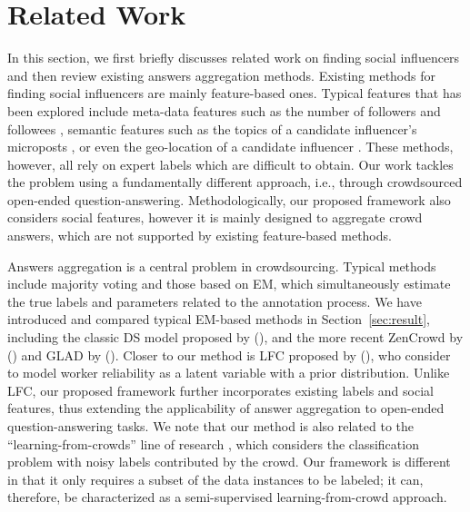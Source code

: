 \section{Related Work}

In this section, we first briefly discusses related work on finding social influencers and then review existing answers aggregation methods. Existing methods for finding social influencers are mainly feature-based ones. Typical features that has been explored include meta-data features such as the number of followers and followees \cite{Lehmann2013,Cheng2014}, semantic features such as the topics of a candidate influencer's microposts \cite{riahi2012finding,wei2016learning}, or even the geo-location of a candidate influencer \cite{Cheng2014} . These methods, however, all rely on expert labels which are difficult to obtain. Our work tackles the problem using a fundamentally different approach, i.e., through crowdsourced open-ended question-answering. Methodologically, our proposed framework also considers social features, however it is mainly designed to aggregate crowd answers, which are not supported by existing feature-based methods.


Answers aggregation is a central problem in crowdsourcing. Typical methods include majority voting \cite{sheng2008get} and those based on EM, which simultaneously estimate the true labels and parameters related to the annotation process. We have introduced and compared typical EM-based methods in Section~\ref{sec:result}, including the classic DS model proposed by \citeauthor{dawid1979maximum} (\citeyear{dawid1979maximum}), and the more recent ZenCrowd by \citeauthor{demartini2012zencrowd} (\citeyear{demartini2012zencrowd}) and GLAD by \citeauthor{whitehill2009whose} (\citeyear{whitehill2009whose}). Closer to our method is LFC proposed by \citeauthor{raykar2010learning} (\citeyear{raykar2010learning}), who consider to model worker reliability as a latent variable with a prior distribution. Unlike LFC, our proposed framework further incorporates existing labels and social features, thus extending the applicability of answer aggregation to open-ended question-answering tasks. We note that our method is also related to the ``learning-from-crowds'' line of research \cite{raykar2010learning,tian2012learning,yang2018leveraging}, which considers the classification problem with noisy labels contributed by the crowd. Our framework is different in that it only requires a subset of the data instances to be labeled; it can, therefore, be characterized as a semi-supervised learning-from-crowd approach. 